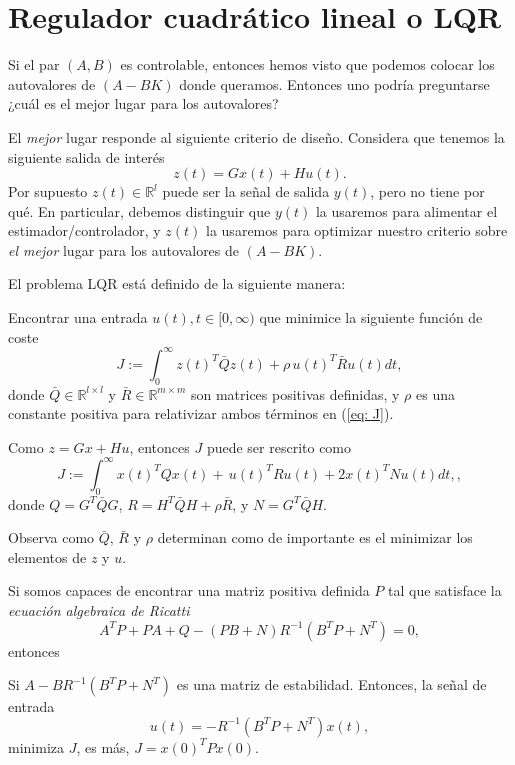 \section{Regulador cuadrático lineal o LQR}
Si el par $(A,B)$ es controlable, entonces hemos visto que podemos colocar los autovalores de $(A-BK)$ donde queramos. Entonces uno podría preguntarse ¿cuál es el mejor lugar para los autovalores?

El \emph{mejor} lugar responde al siguiente criterio de diseño. Considera que tenemos la siguiente salida de interés
\begin{equation}
	z(t) = G x(t) + H u(t) \label{eq: z}.
\end{equation}
Por supuesto $z(t)\in\mathbb{R}^l$ puede ser la señal de salida $y(t)$, pero no tiene por qué. En particular, debemos distinguir que $y(t)$ la usaremos para alimentar el estimador/controlador, y $z(t)$ la usaremos para optimizar nuestro criterio sobre \emph{el mejor} lugar para los autovalores de $(A-BK)$.

El problema LQR está definido de la siguiente manera:
\begin{problem}
	Encontrar una entrada $u(t), t\in[0,\infty)$ que minimice la siguiente función de coste
\begin{equation}
	J := \int_0^\infty z(t)^T \bar Q z(t) + \rho \, u(t)^T \bar R u(t) dt,
	\label{eq: J}
\end{equation}
	donde $\bar Q\in\mathbb{R}^{l\times l}$ y $\bar R\in\mathbb{R}^{m\times m}$ son matrices positivas definidas, y $\rho$ es una constante positiva para relativizar ambos términos en (\ref{eq: J}).
\end{problem}

Como $z = Gx + Hu$, entonces $J$ puede ser rescrito como
\begin{equation}
	J := \int_0^\infty x(t)^T Q x(t) + \, u(t)^T R u(t) + 2x(t)^T N u(t)dt,
	\label{eq: J2},
\end{equation}
donde $Q = G^T\bar Q G$, $R = H^T\bar QH + \rho \bar R$, y $N = G^T\bar Q H$.

Observa como $\bar Q$, $\bar R$ y $\rho$ determinan como de importante es el minimizar los elementos de $z$ y $u$.

Si somos capaces de encontrar una matriz positiva definida $P$ tal que satisface la \emph{ecuación algebraica de Ricatti}
\begin{equation}
	A^TP + PA + Q - (PB + N)R^{-1}(B^TP + N^T) = 0,
\end{equation}
entonces
\begin{theorem}
	Si $A - BR^{-1}(B^TP+N^T)$ es una matriz de estabilidad. Entonces, la señal de entrada
	\begin{equation}
	u(t) = -R^{-1}(B^TP+N^T) x(t),
	\end{equation}
	minimiza $J$, es más, $J = x(0)^T P x(0)$.
\end{theorem}

